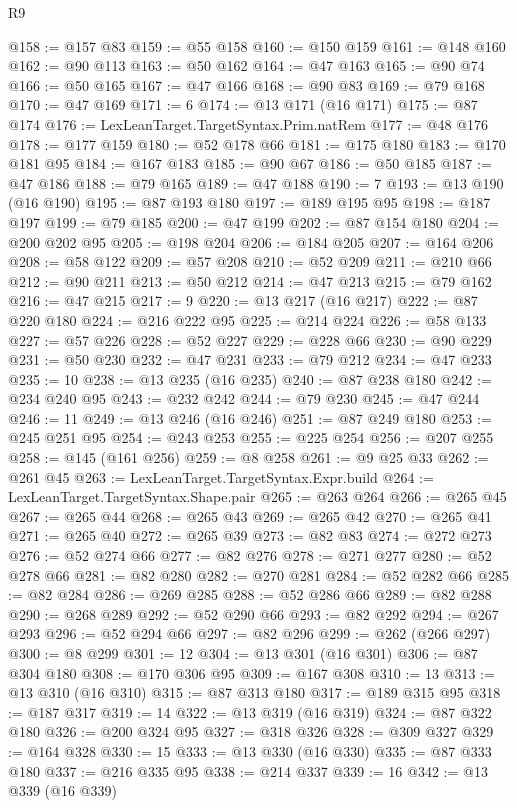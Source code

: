 \begin{lexlean}{R9}
\begin{coremodule}
@158 := @157 @83
@159 := @55 @158
@160 := @150 @159
@161 := @148 @160
@162 := @90 @113
@163 := @50 @162
@164 := @47 @163
@165 := @90 @74
@166 := @50 @165
@167 := @47 @166
@168 := @90 @83
@169 := @79 @168
@170 := @47 @169
@171 := 6
@174 := @13 @171 (@16 @171)
@175 := @87 @174
@176 := LexLeanTarget.TargetSyntax.Prim.natRem
@177 := @48 @176
@178 := @177 @159
@180 := @52 @178 @66
@181 := @175 @180
@183 := @170 @181 @95
@184 := @167 @183
@185 := @90 @67
@186 := @50 @185
@187 := @47 @186
@188 := @79 @165
@189 := @47 @188
@190 := 7
@193 := @13 @190 (@16 @190)
@195 := @87 @193 @180
@197 := @189 @195 @95
@198 := @187 @197
@199 := @79 @185
@200 := @47 @199
@202 := @87 @154 @180
@204 := @200 @202 @95
@205 := @198 @204
@206 := @184 @205
@207 := @164 @206
@208 := @58 @122
@209 := @57 @208
@210 := @52 @209
@211 := @210 @66
@212 := @90 @211
@213 := @50 @212
@214 := @47 @213
@215 := @79 @162
@216 := @47 @215
@217 := 9
@220 := @13 @217 (@16 @217)
@222 := @87 @220 @180
@224 := @216 @222 @95
@225 := @214 @224
@226 := @58 @133
@227 := @57 @226
@228 := @52 @227
@229 := @228 @66
@230 := @90 @229
@231 := @50 @230
@232 := @47 @231
@233 := @79 @212
@234 := @47 @233
@235 := 10
@238 := @13 @235 (@16 @235)
@240 := @87 @238 @180
@242 := @234 @240 @95
@243 := @232 @242
@244 := @79 @230
@245 := @47 @244
@246 := 11
@249 := @13 @246 (@16 @246)
@251 := @87 @249 @180
@253 := @245 @251 @95
@254 := @243 @253
@255 := @225 @254
@256 := @207 @255
@258 := @145 (@161 @256)
@259 := @8 @258
@261 := @9 @25 @33
@262 := @261 @45
@263 := LexLeanTarget.TargetSyntax.Expr.build
@264 := LexLeanTarget.TargetSyntax.Shape.pair
@265 := @263 @264
@266 := @265 @45
@267 := @265 @44
@268 := @265 @43
@269 := @265 @42
@270 := @265 @41
@271 := @265 @40
@272 := @265 @39
@273 := @82 @83
@274 := @272 @273
@276 := @52 @274 @66
@277 := @82 @276
@278 := @271 @277
@280 := @52 @278 @66
@281 := @82 @280
@282 := @270 @281
@284 := @52 @282 @66
@285 := @82 @284
@286 := @269 @285
@288 := @52 @286 @66
@289 := @82 @288
@290 := @268 @289
@292 := @52 @290 @66
@293 := @82 @292
@294 := @267 @293
@296 := @52 @294 @66
@297 := @82 @296
@299 := @262 (@266 @297)
@300 := @8 @299
@301 := 12
@304 := @13 @301 (@16 @301)
@306 := @87 @304 @180
@308 := @170 @306 @95
@309 := @167 @308
@310 := 13
@313 := @13 @310 (@16 @310)
@315 := @87 @313 @180
@317 := @189 @315 @95
@318 := @187 @317
@319 := 14
@322 := @13 @319 (@16 @319)
@324 := @87 @322 @180
@326 := @200 @324 @95
@327 := @318 @326
@328 := @309 @327
@329 := @164 @328
@330 := 15
@333 := @13 @330 (@16 @330)
@335 := @87 @333 @180
@337 := @216 @335 @95
@338 := @214 @337
@339 := 16
@342 := @13 @339 (@16 @339)

\end{coremodule}
\end{lexlean}
